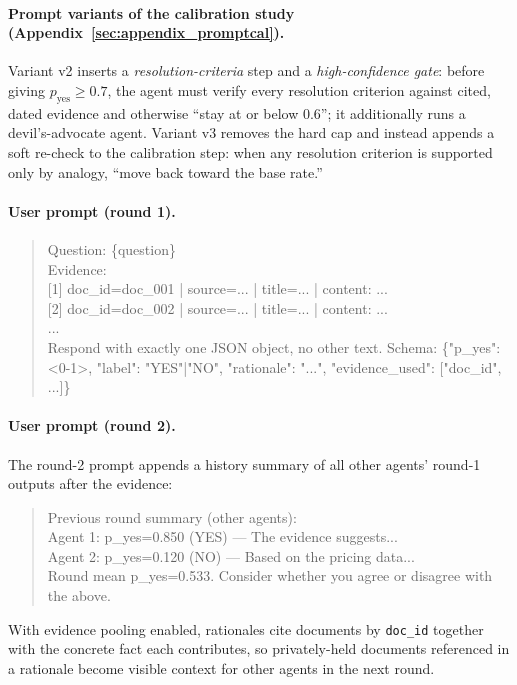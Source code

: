 \paragraph{Prompt variants of the calibration study (Appendix~\ref{sec:appendix_promptcal}).}
Variant v2 inserts a \emph{resolution-criteria} step and a \emph{high-confidence gate}: before giving $p_{\mathrm{yes}} \ge 0.7$, the agent must verify every resolution criterion against cited, dated evidence and otherwise ``stay at or below 0.6''; it additionally runs a devil's-advocate agent.
Variant v3 removes the hard cap and instead appends a soft re-check to the calibration step: when any resolution criterion is supported only by analogy, ``move back toward the base rate.''

\paragraph{User prompt (round 1).}
\begin{quote}
\small\ttfamily
Question: \{question\}\\[2pt]
Evidence:\\
{[}1{]} doc\_id=doc\_001 | source=... | title=... | content: ...\\
{[}2{]} doc\_id=doc\_002 | source=... | title=... | content: ...\\
...\\[2pt]
Respond with exactly one JSON object, no other text. Schema: \{"p\_yes": <0-1>, "label": "YES"|"NO", "rationale": "...", "evidence\_used": {[}"doc\_id", ...{]}\}
\end{quote}

\paragraph{User prompt (round 2).}
The round-2 prompt appends a history summary of all other agents' round-1 outputs after the evidence:
\begin{quote}
\small\ttfamily
Previous round summary (other agents):\\
\quad Agent 1: p\_yes=0.850 (YES) --- The evidence suggests...\\
\quad Agent 2: p\_yes=0.120 (NO) --- Based on the pricing data...\\
\quad Round mean p\_yes=0.533. Consider whether you agree or disagree with the above.
\end{quote}
With evidence pooling enabled, rationales cite documents by \texttt{doc\_id} together with the concrete fact each contributes, so privately-held documents referenced in a rationale become visible context for other agents in the next round.
